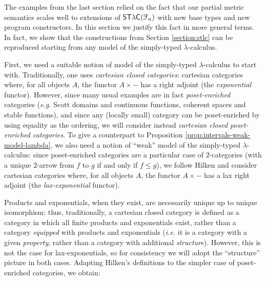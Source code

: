 The examples from the last section relied on the fact that our partial metric semantics scales well to extensions of $\mathsf{ST\lambda C}(\mathcal F_{n})$ with new base types and new program constructors. In this section we justify this fact in more general terms. In fact, we show that the constructions from Section \ref{section:stlc} can be reproduced starting from any model of the simply-typed $\lambda$-calculus. 


First, we need a suitable notion of model of the simply-typed $\lambda$-calculus to start with. Traditionally, one uses \emph{cartesian closed categories}: cartesian categories where, for all objects $A$, the functor $A \times -$ has a right adjoint (the \emph{exponential} functor). However, since many usual examples are in fact \emph{poset-enriched} categories (\textit{e.g.} Scott domains and continuous functions, coherent spaces and stable functions), and since any (locally small) category can be poset-enriched by using equality as the ordering, we will consider instead \emph{cartesian closed poset-enriched categories}. To give a counterpart to Proposition \ref{prop:intervals-weak-model-lambda}, we also need a notion of ``weak'' model of the simply-typed $\lambda$-calculus: since poset-enriched categories are a particular case of $2$-categories (with a unique $2$-arrow from $f$ to $g$ if and only if $f \leq g$), we follow Hilken \cite{hilken:2-lambda} and consider cartesian categories where, for all objects $A$, the functor $A \times -$ has a lax right adjoint (the \emph{lax-exponential} functor).

Products and exponentials, when they exist, are necessarily unique up to unique isomorphism: thus, traditionally, a cartesian closed category is defined as a category in which all finite products and exponentials exist, rather than a category \emph{equipped} with products and exponentials (\textit{i.e.} it is a category with a given \emph{property}, rather than a category with additional \emph{structure}). However, this is not the case for lax-exponentials, so for consistency we will adopt the ``structure'' picture in both cases. Adapting Hilken's definitions \cite{hilken:2-lambda} to the simpler case of poset-enriched categories, we obtain:

